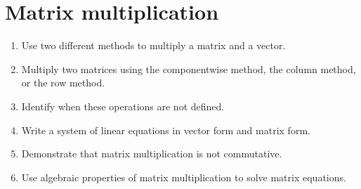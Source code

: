 \section{Matrix multiplication}

\begin{outcome}
  \begin{enumerate}
  \item Use two different methods to multiply a matrix and a vector.
  \item Multiply two matrices using the componentwise method, the
    column method, or the row method.
  \item Identify when these operations are not defined.
  \item Write a system of linear equations in vector form and matrix form.
  \item Demonstrate that matrix multiplication is not commutative.
  \item Use algebraic properties of matrix multiplication to
    solve matrix equations.
  \end{enumerate}
\end{outcome}

